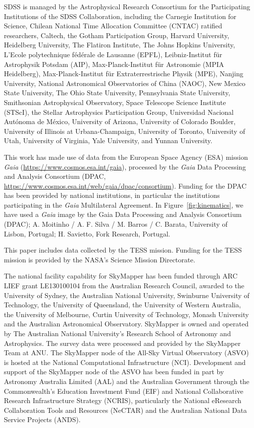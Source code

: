 \documentclass{natureprintstyle}
\begin{document}
\begin{addendum}
SDSS is managed by the Astrophysical Research Consortium for the Participating Institutions of the SDSS Collaboration, including the Carnegie Institution for Science, Chilean National Time Allocation Committee (CNTAC) ratified researchers, Caltech, the Gotham Participation Group, Harvard University, Heidelberg University, The Flatiron Institute, The Johns Hopkins University, L'Ecole polytechnique f\'{e}d\'{e}rale de Lausanne (EPFL), Leibniz-Institut f\"{u}r Astrophysik Potsdam (AIP), Max-Planck-Institut f\"{u}r Astronomie (MPIA Heidelberg), Max-Planck-Institut f\"{u}r Extraterrestrische Physik (MPE), Nanjing University, National Astronomical Observatories of China (NAOC), New Mexico State University, The Ohio State University, Pennsylvania State University, Smithsonian Astrophysical Observatory, Space Telescope Science Institute (STScI), the Stellar Astrophysics Participation Group, Universidad Nacional Aut\'{o}noma de M\'{e}xico, University of Arizona, University of Colorado Boulder, University of Illinois at Urbana-Champaign, University of Toronto, University of Utah, University of Virginia, Yale University, and Yunnan University.

This work has made use of data from the European Space Agency (ESA) mission
{\it Gaia} (\url{https://www.cosmos.esa.int/gaia}), processed by the {\it Gaia}
Data Processing and Analysis Consortium (DPAC,
\url{https://www.cosmos.esa.int/web/gaia/dpac/consortium}). Funding for the DPAC
has been provided by national institutions, in particular the institutions
participating in the {\it Gaia} Multilateral Agreement.
In Figure~\ref{fig:kinematics}, we have used a {\it Gaia} image by the Gaia Data Processing and Analysis Consortium (DPAC); A. Moitinho / A. F. Silva / M. Barros / C. Barata, University of Lisbon, Portugal; H. Savietto, Fork Research, Portugal.

This paper includes data collected by the TESS mission. Funding for the TESS mission is provided by the NASA's Science Mission Directorate.

The national facility capability for SkyMapper has been funded through ARC
LIEF grant LE130100104 from the Australian Research Council, awarded to
the University of Sydney, the Australian National University, Swinburne
University of Technology, the University of Queensland, the University
of Western Australia, the University of Melbourne, Curtin University of
Technology, Monash University and the Australian Astronomical Observatory.
SkyMapper is owned and operated by The Australian National University's
Research School of Astronomy and Astrophysics.  The survey data were
processed and provided by the SkyMapper Team at ANU.  The SkyMapper node
of the All-Sky Virtual Observatory (ASVO) is hosted at the National
Computational Infrastructure (NCI).  Development and support of the
SkyMapper node of the ASVO has been funded in part by Astronomy Australia
Limited (AAL) and the Australian Government through the Commonwealth's
Education Investment Fund (EIF) and National Collaborative Research
Infrastructure Strategy (NCRIS), particularly the National eResearch
Collaboration Tools and Resources (NeCTAR) and the Australian National
Data Service Projects (ANDS).


\end{addendum}
\end{document}
